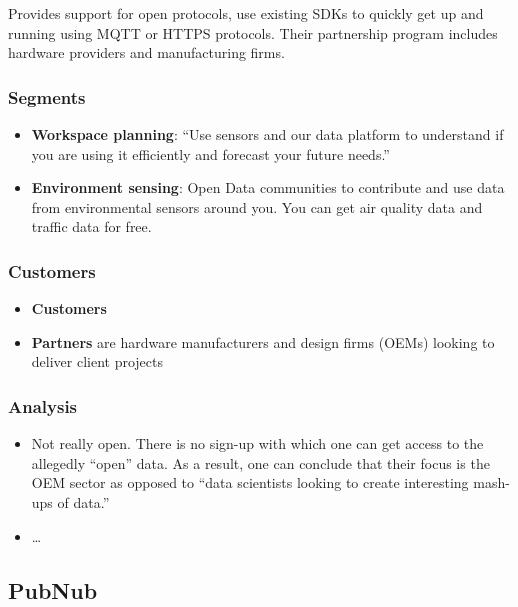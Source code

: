 Provides support for open protocols, use existing SDKs to quickly get up
and running using MQTT or HTTPS protocols. Their partnership program
includes hardware providers and manufacturing firms.

\subsubsection{Segments}\label{segments}

\begin{itemize}
\tightlist
\item
  \textbf{Workspace planning}: ``Use sensors and our data platform to
  understand if you are using it efficiently and forecast your future
  needs.''
\item
  \textbf{Environment sensing}: Open Data communities to contribute and
  use data from environmental sensors around you. You can get air
  quality data and traffic data for free.
\end{itemize}

\subsubsection{Customers}\label{customers}

\begin{itemize}
\tightlist
\item
  \textbf{Customers}
\item
  \textbf{Partners} are hardware manufacturers and design firms (OEMs)
  looking to deliver client projects
\end{itemize}

\subsubsection{Analysis}\label{analysis}

\begin{itemize}
\tightlist
\item
  Not really open. There is no sign-up with which one can get access to
  the allegedly ``open'' data. As a result, one can conclude that their
  focus is the OEM sector as opposed to ``data scientists looking to
  create interesting mash-ups of data.''
\item
  \ldots{}
\end{itemize}

\subsection{PubNub}\label{pubnub}

